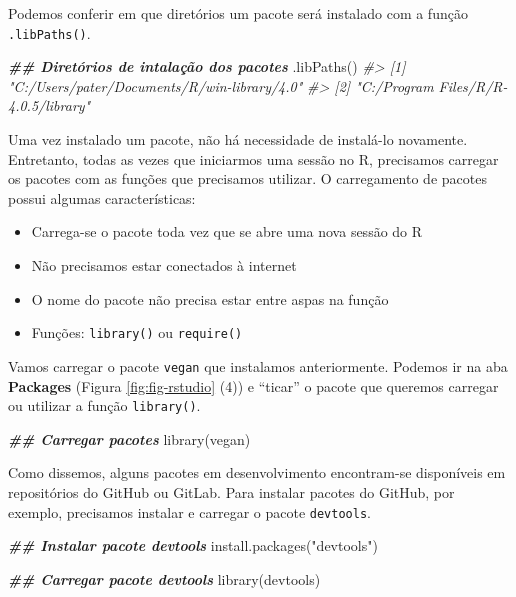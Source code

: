 \documentclass[
]{book}
\newenvironment{Shaded}{\begin{snugshade}}{\end{snugshade}}
\newcommand{\CommentTok}[1]{\textcolor[rgb]{0.37,0.37,0.37}{\textit{#1}}}
\newcommand{\DocumentationTok}[1]{\textcolor[rgb]{0.37,0.37,0.37}{\textbf{\textit{#1}}}}
\newcommand{\FunctionTok}[1]{\textcolor[rgb]{0,0,0}{#1}}
\newcommand{\NormalTok}[1]{#1}
\newcommand{\StringTok}[1]{\textcolor[rgb]{0.5,0.5,0.5}{#1}}
\providecommand{\tightlist}{%
  \setlength{\itemsep}{0pt}\setlength{\parskip}{0pt}}
\begin{document}
Podemos conferir em que diretórios um pacote será instalado com a função \texttt{.libPaths()}.

\begin{Shaded}
\begin{Highlighting}[]
\DocumentationTok{\#\# Diretórios de intalação dos pacotes}
\FunctionTok{.libPaths}\NormalTok{()}
\CommentTok{\#\textgreater{} [1] "C:/Users/pater/Documents/R/win{-}library/4.0"}
\CommentTok{\#\textgreater{} [2] "C:/Program Files/R/R{-}4.0.5/library"}
\end{Highlighting}
\end{Shaded}

Uma vez instalado um pacote, não há necessidade de instalá-lo novamente. Entretanto, todas as vezes que iniciarmos uma sessão no R, precisamos carregar os pacotes com as funções que precisamos utilizar. O carregamento de pacotes possui algumas características:

\begin{itemize}
\tightlist
\item
  Carrega-se o pacote toda vez que se abre uma nova sessão do R
\item
  Não precisamos estar conectados à internet
\item
  O nome do pacote não precisa estar entre aspas na função
\item
  Funções: \texttt{library()} ou \texttt{require()}
\end{itemize}

Vamos carregar o pacote \texttt{vegan} que instalamos anteriormente. Podemos ir na aba \textbf{Packages} (Figura \ref{fig:fig-rstudio} (4)) e ``ticar'' o pacote que queremos carregar ou utilizar a função \texttt{library()}.

\begin{Shaded}
\begin{Highlighting}[]
\DocumentationTok{\#\# Carregar pacotes}
\FunctionTok{library}\NormalTok{(vegan)}
\end{Highlighting}
\end{Shaded}

Como dissemos, alguns pacotes em desenvolvimento encontram-se disponíveis em repositórios do GitHub ou GitLab. Para instalar pacotes do GitHub, por exemplo, precisamos instalar e carregar o pacote \texttt{devtools}.

\begin{Shaded}
\begin{Highlighting}[]
\DocumentationTok{\#\# Instalar pacote devtools}
\FunctionTok{install.packages}\NormalTok{(}\StringTok{"devtools"}\NormalTok{)}

\DocumentationTok{\#\# Carregar pacote devtools}
\FunctionTok{library}\NormalTok{(devtools)}
\end{Highlighting}
\end{Shaded}
\end{document}
